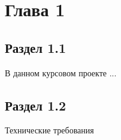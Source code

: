 \chapter[Глава 1]
{Глава 1}

\section{Раздел 1.1}\par
В данном курсовом проекте ...

\section{Раздел 1.2}\par
Технические требования 